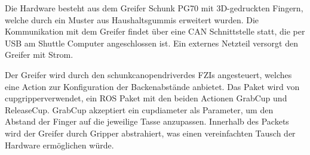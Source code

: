 Die Hardware besteht aus dem Greifer Schunk PG70 mit 3D-gedruckten Fingern, welche durch ein Muster aus Haushaltsgummis erweitert wurden. Die Kommunikation mit dem Greifer findet über eine CAN Schnittstelle statt, die per USB am Shuttle Computer angeschlossen ist. Ein externes Netzteil versorgt den Greifer mit Strom.

Der Greifer wird durch den \glqq schunk\textunderscore canopen\textunderscore driver\grqq des FZIs angesteuert, welches eine Action zur Konfiguration der Backenabstände anbietet. Das Paket wird von \glqq cup\textunderscore gripper\grqq verwendet, ein ROS Paket mit den beiden Actionen GrabCup und ReleaseCup. GrabCup akzeptiert ein cup\textunderscore diameter als Parameter, um den Abstand der Finger auf die jeweilige Tasse anzupassen. Innerhalb des Packets wird der Greifer durch \glqq Gripper \grqq abstrahiert, was einen vereinfachten Tausch der Hardware ermöglichen würde.
